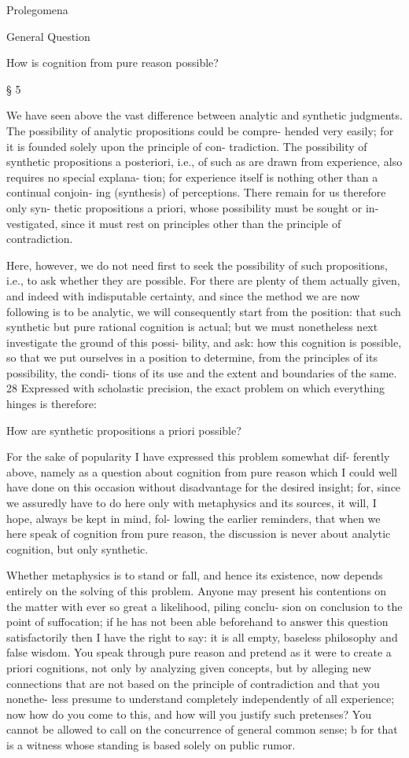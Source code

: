 Prolegomena

General Question

How is cognition from pure reason possible?

§ 5

We have seen above the vast difference between analytic and synthetic
judgments. The possibility of analytic propositions could be compre-
hended very easily; for it is founded solely upon the principle of con-
tradiction. The possibility of synthetic propositions a posteriori, i.e., of
such as are drawn from experience, also requires no special explana-
tion; for experience itself is nothing other than a continual conjoin-
ing (synthesis) of perceptions. There remain for us therefore only syn-
thetic propositions a priori, whose possibility must be sought or in-
vestigated, since it must rest on principles other than the principle of
contradiction.

Here, however, we do not need ﬁrst to seek the possibility of such
propositions, i.e., to ask whether they are possible. For there are plenty
of them actually given, and indeed with indisputable certainty, and since
the method we are now following is to be analytic, we will consequently
start from the position: that such synthetic but pure rational cognition is
actual; but we must nonetheless next investigate the ground of this possi-
bility, and ask: how this cognition is possible, so that we put ourselves in
a position to determine, from the principles of its possibility, the condi-
tions of its use and the extent and boundaries of the same. 28 Expressed
with scholastic precision, the exact problem on which everything hinges
is therefore:

How are synthetic propositions a priori possible?

For the sake of popularity I have expressed this problem somewhat dif-
ferently above, namely as a question about cognition from pure reason
which I could well have done on this occasion without disadvantage for
the desired insight; for, since we assuredly have to do here only with
metaphysics and its sources, it will, I hope, always be kept in mind, fol-
lowing the earlier reminders, that when we here speak of cognition from
pure reason, the discussion is never about analytic cognition, but only
synthetic.

Whether metaphysics is to stand or fall, and hence its existence, now
depends entirely on the solving of this problem. Anyone may present his
contentions on the matter with ever so great a likelihood, piling conclu-
sion on conclusion to the point of suffocation; if he has not been able
beforehand to answer this question satisfactorily then I have the right
to say: it is all empty, baseless philosophy and false wisdom. You speak
through pure reason and pretend as it were to create a priori cognitions,
not only by analyzing given concepts, but by alleging new connections
that are not based on the principle of contradiction and that you nonethe-
less presume to understand completely independently of all experience;
now how do you come to this, and how will you justify such pretenses?
You cannot be allowed to call on the concurrence of general common
sense; b for that is a witness whose standing is based solely on public
rumor.

